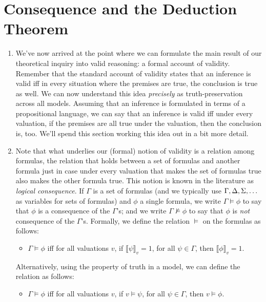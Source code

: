 \section{Consequence and the Deduction Theorem}	

	\begin{enumerate}[\thesection.1]

		\item We've now arrived at the point where we can formulate the main result of our theoretical inquiry into valid reasoning: a formal account of validity. Remember that the standard account of validity states that an inference is valid iff in every situation where the premises are true, the conclusion is true as well. We can now understand this idea \emph{precisely} as truth-preservation across all models. Assuming that an inference is formulated in terms of a propositional language, we can say that an inference is valid iff under every valuation, if the premises are all true under the valuation, then the conclusion is, too. We'll spend this section working this idea out in a bit more detail.
		
		\item Note that what underlies our (formal) notion of validity is a relation among formulas, the relation that holds between a set of formulas and another formula just in case under every valuation that makes the set of formulas true also makes the other formula true. This notion is known in the literature as \emph{logical consequence}. If $\Gamma$ is a set of formulas (and we typically use $\Gamma,\Delta,\Sigma, \mathellipsis$ as variables for sets of formulas) and $\phi$ a single formula, we write $\Gamma\vDash \phi$ to say that $\phi$ is a consequence of the $\Gamma$'s; and we write $\Gamma\nvDash \phi$ to say that $\phi$ is \emph{not} consequence of the $\Gamma$'s. Formally, we define the relation $\vDash$ on the formulas as follows:		
		\begin{itemize}
		
			\item $\Gamma\vDash\phi$ iff for all valuations $v$, if $\llbracket\psi\rrbracket_v=1$, for all $\psi\in\Gamma$, then $\llbracket\phi\rrbracket_v=1$.
		
		\end{itemize}
Alternatively, using the property of truth in a model, we can define the relation as follows:
		\begin{itemize}
		
			\item $\Gamma\vDash\phi$ iff for all valuations $v$, if $v\vDash\psi$, for all $\psi\in\Gamma$, then $v\vDash\phi$.
		

\end{itemize}
\end{enumerate}
